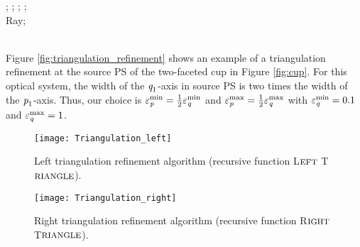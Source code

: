 \begin{algorithm}[h]
\begin{algorithmic}[1]
\EndIf
\EndFor
\State{};
\State{};
\State{};
\State{};
\EndIf \\
\Return Ray;
\EndProcedure
\end{algorithmic}
\end{algorithm}
\\ \indent Figure \ref{fig:triangulation_refinement} shows an example of a triangulation refinement at the source PS of the two-faceted cup in Figure \ref{fig:cup}. 
For this optical system, the width of the $\textit{q}_1$-axis in source PS is two times the width of the $\textit{p}_1$-axis.
Thus, our choice is $\varepsilon_{\textit{p}}^{\textrm{min}}=\frac{1}{2}\varepsilon_{\textit{q}}^{\textrm{min}}$ and $\varepsilon_{\textit{p}}^{\textrm{max}} = \frac{1}{2}\varepsilon_{\textit{q}}^{\textrm{max}}$
with $\varepsilon_{\textit{q}}^{\textrm{min}}=0.1$ and $\varepsilon_{\textit{q}}^{\textrm{max}}=1$.
 \begin{figure}[h]
 \begin{minipage}[t]{0.48\textwidth}
\centering
    \texttt{[image: Triangulation\_left]}
    \caption{Left triangulation refinement algorithm (recursive function L$\footnotesize{\textrm{EFT}}$ T$\footnotesize{\textrm{RIANGLE}}$).}
    \label{fig:triangulation_left}
\end{minipage}
\hfill
\begin{minipage}[t]{0.48\textwidth}
\centering
    \texttt{[image: Triangulation\_right]}
    \caption{Right triangulation refinement algorithm (recursive function R$\footnotesize{\textrm{IGHT}}$ T$\footnotesize{\textrm{RIANGLE}}$).}
    \label{fig:triangulation_right}
\end{minipage}
\end{figure}
